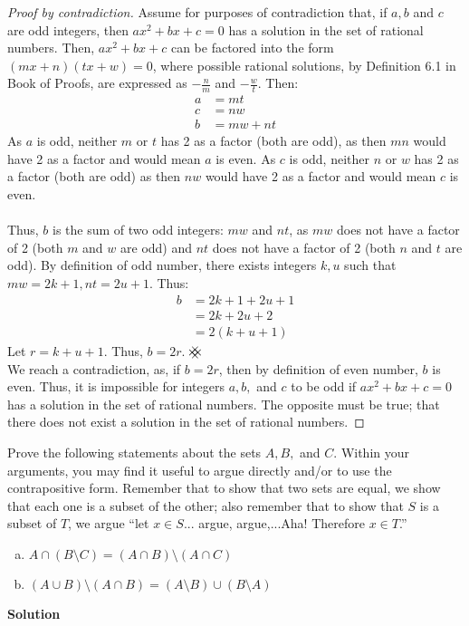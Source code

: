 \documentclass[11pt]{scrartcl}
\theoremstyle{dotlessP}
\theoremstyle{dotlessN}
\newcommand{\unite}{\cup}
\newcommand{\inter}{\cap}
\newcommand{\smin}{\setminus}
\newcommand{\contradiction}{{\hbox{%
    \setbox0=\hbox{$\mkern-3mu\times\mkern-3mu$}%
    \setbox1=\hbox to0pt{\hss$\times$\hss}%
    \copy0\raisebox{0.5\wd0}{\copy1}\raisebox{-0.5\wd0}{\box1}\box0
}}}
\begin{document}
\begin{proof}
	[Proof by contradiction]
	Assume for purposes of contradiction that, if $a,b$ and $c$ are odd integers, then $ax^2 + bx + c = 0$ has a solution in the set of rational numbers. Then, $ax^2 + bx + c$ can be factored into the form $(mx + n)(tx + w)=0$, where possible rational solutions, by Definition 6.1 in Book of Proofs, are expressed as $-\frac{n}{m}$ and $-\frac{w}{t}$. Then:
 \begin{align*}
	 a &= mt \\
	 c &= nw \\
	 b &= mw + nt 
\end{align*}
As $a$ is odd, neither $m$ or $t$ has 2 as a factor (both are odd), as then $mn$ would have 2 as a factor and would mean $a$ is even. As $c$ is odd, neither $n$ or $w$ has 2 as a factor (both are odd) as then $nw$ would have 2 as a factor and would mean $c$ is even. \\
\\

Thus, $b$ is the sum of two odd integers: $mw$ and $nt$, as $mw$ does not have a factor of 2 (both $m$ and $w$ are odd) and $nt$ does not have a factor of 2 (both $n$ and $t$ are odd). By definition of odd number, there exists integers $k,u$ such that $mw = 2k+1, nt = 2u+1$. Thus: 
\begin{align*}
	b &= 2k + 1 + 2u + 1 \\
	  &= 2k + 2u + 2 \\
	  &= 2(k+u+1)
\end{align*}
 Let $r = k+u+1$. Thus,  $b = 2r$. $\contradiction$
\\

We reach a contradiction, as, if $b = 2r$, then by definition of even number,  $b$ is even. Thus, it is impossible for integers $a,b,$ and $c$ to be odd if $ax^2 + bx + c = 0$ has a solution in the set of rational numbers. The opposite must be true; that there does not exist a solution in the set of rational numbers.
\end{proof}
\begin{ques}
	Prove the following statements about the sets $A,B,$ and $C$. Within your arguments, you may find it useful to argue directly and/or to use the contrapositive form. Remember that to show that two sets are equal, we show that each one is a subset of the other; also remember that to show that $S$ is a subset of $T$, we argue ``let $x \in S$... argue, argue,...Aha! Therefore $x \in T$.''
	\begin{enumerate}[(a)]
		\item $A \inter (B \setminus C) = (A \inter B) \setminus (A \inter C)$
		\item $(A \unite B) \setminus (A \inter B) = (A \setminus B) \unite (B \smin A)$
	\end{enumerate}
\end{ques}
\textbf{Solution}
\end{document}
